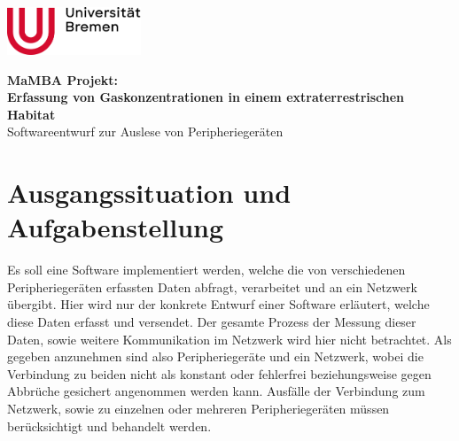 \documentclass[a4paper, 12pt]{article}
\begin{document}
\begin{multicols}{2}
\includegraphics[width=0.3\textwidth]{bilder/Uni-Bremen_Logo.png}
\\
\end{multicols}
\begin{center}
{\LARGE\bfseries MaMBA Projekt:\\Erfassung von Gaskonzentrationen in einem extraterrestrischen Habitat}
\\
{\Large Softwareentwurf zur Auslese von Peripheriegeräten}
\end{center}
\section{Ausgangssituation und Aufgabenstellung}
Es soll eine Software implementiert werden, welche die von verschiedenen Peripheriegeräten erfassten Daten abfragt, verarbeitet und an ein Netzwerk übergibt. Hier wird nur der konkrete Entwurf einer Software erläutert, welche diese Daten erfasst und versendet. Der gesamte Prozess der Messung dieser Daten, sowie weitere Kommunikation im Netzwerk wird hier nicht betrachtet. Als gegeben anzunehmen sind also Peripheriegeräte und ein Netzwerk, wobei die Verbindung zu beiden nicht als konstant oder fehlerfrei beziehungsweise gegen Abbrüche gesichert angenommen werden kann. Ausfälle der Verbindung zum Netzwerk, sowie zu einzelnen oder mehreren Peripheriegeräten müssen berücksichtigt und behandelt werden.\\
\end{document}
